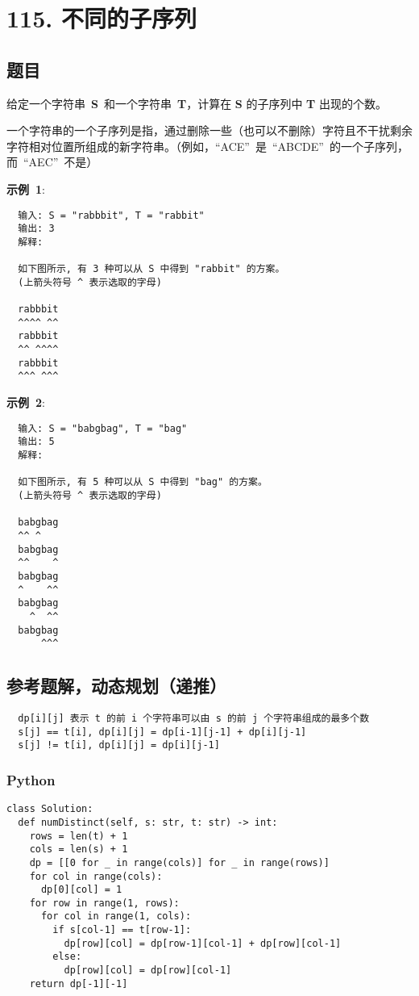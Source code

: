 \newpage
\section{115. 不同的子序列}
\label{leetcode:115}

\subsection{题目}

给定一个字符串 \textbf{S} 和一个字符串 \textbf{T}，计算在 \textbf{S} 的子序列中 \textbf{T} 出现的个数。

一个字符串的一个子序列是指，通过删除一些（也可以不删除）字符且不干扰剩余
字符相对位置所组成的新字符串。（例如，``ACE'' 是 ``ABCDE'' 的一个子序列，而 ``AEC'' 不是）

\textbf{示例 1}:

\begin{verbatim}
  输入: S = "rabbbit", T = "rabbit"
  输出: 3
  解释:

  如下图所示, 有 3 种可以从 S 中得到 "rabbit" 的方案。
  (上箭头符号 ^ 表示选取的字母)

  rabbbit
  ^^^^ ^^
  rabbbit
  ^^ ^^^^
  rabbbit
  ^^^ ^^^
\end{verbatim}

\textbf{示例 2}:

\begin{verbatim}
  输入: S = "babgbag", T = "bag"
  输出: 5
  解释:

  如下图所示, 有 5 种可以从 S 中得到 "bag" 的方案。
  (上箭头符号 ^ 表示选取的字母)

  babgbag
  ^^ ^
  babgbag
  ^^    ^
  babgbag
  ^    ^^
  babgbag
    ^  ^^
  babgbag
      ^^^
\end{verbatim}

\subsection{参考题解，动态规划（递推）}

\begin{verbatim}
  dp[i][j] 表示 t 的前 i 个字符串可以由 s 的前 j 个字符串组成的最多个数
  s[j] == t[i], dp[i][j] = dp[i-1][j-1] + dp[i][j-1]
  s[j] != t[i], dp[i][j] = dp[i][j-1]
\end{verbatim}

\subsubsection{Python}

\begin{verbatim}
class Solution:
  def numDistinct(self, s: str, t: str) -> int:
    rows = len(t) + 1
    cols = len(s) + 1
    dp = [[0 for _ in range(cols)] for _ in range(rows)]
    for col in range(cols):
      dp[0][col] = 1
    for row in range(1, rows):
      for col in range(1, cols):
        if s[col-1] == t[row-1]:
          dp[row][col] = dp[row-1][col-1] + dp[row][col-1]
        else:
          dp[row][col] = dp[row][col-1]
    return dp[-1][-1]
\end{verbatim}


